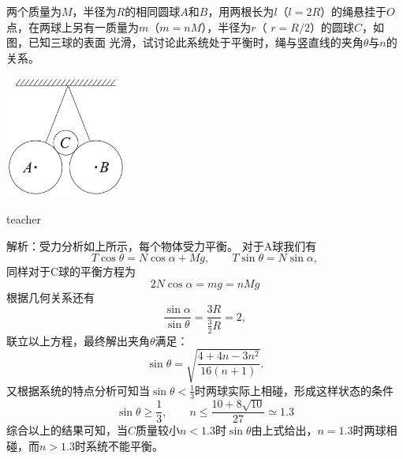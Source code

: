 \begin{example}
两个质量为$M$，半径为$R$的相同圆球$A$和$B$，用两根长为$l$（$l = 2R$）的绳悬挂于$O$点，在两球上另有一质量为$m$（$m = nM$），半径为$r$（
$r=R/2$）的圆球$C$，如图，已知三球的表面
光滑，试讨论此系统处于平衡时，绳与竖直线的夹角$θ$与$n$的关系。
\begin{flushright}
\includegraphics[width = 0.3\textwidth]{images/static-force-12.pdf} 
\end{flushright}

\begin{taggedblock}{teacher}

\vspace*{4cm}
\noindent
解析：受力分析如上所示，每个物体受力平衡。
对于A球我们有
\[
T\cos\theta = N\cos\alpha +Mg,\qquad T\sin\theta = N\sin\alpha,
\]
同样对于C球的平衡方程为
\[
2N\cos\alpha  = mg = nMg
\]
根据几何关系还有
\[
\frac{\sin\alpha}{\sin\theta} = \frac{3R}{\frac{3}{2}R} = 2,
\]
联立以上方程，最终解出夹角$\theta$满足：
\[
\sin\theta = \sqrt{\frac{4+4n-3n^2}{16(n+1)}}.
\]
又根据系统的特点分析可知当$\sin\theta<\frac{1}{3}$时两球实际上相碰，形成这样状态的条件
\[
\sin\theta\ge\frac{1}{3},\qquad n\le \frac{10+8\sqrt{10}}{27}\simeq 1.3
\]
综合以上的结果可知，当$C$质量较小$n<1.3$时$\sin\theta $由上式给出，$n=1.3$时两球相碰，而$n>1.3$时系统不能平衡。
\end{taggedblock}
\end{example}










